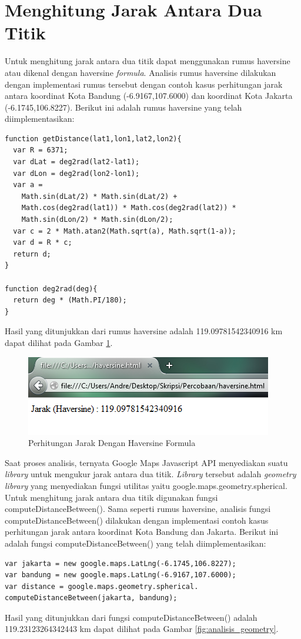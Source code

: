 \section{Menghitung Jarak Antara Dua Titik}
Untuk menghitung jarak antara dua titik dapat menggunakan rumus haversine atau
dikenal dengan haversine \textit{formula}. Analisis rumus haversine dilakukan
dengan implementasi rumus tersebut dengan contoh kasus perhitungan
jarak antara koordinat Kota Bandung (-6.9167,107.6000) dan koordinat Kota
Jakarta (-6.1745,106.8227). Berikut ini adalah rumus haversine yang telah
diimplementasikan:
\begin{verbatim}
function getDistance(lat1,lon1,lat2,lon2){
  var R = 6371; 
  var dLat = deg2rad(lat2-lat1); 
  var dLon = deg2rad(lon2-lon1); 
  var a = 
    Math.sin(dLat/2) * Math.sin(dLat/2) +
    Math.cos(deg2rad(lat1)) * Math.cos(deg2rad(lat2)) * 
    Math.sin(dLon/2) * Math.sin(dLon/2); 
  var c = 2 * Math.atan2(Math.sqrt(a), Math.sqrt(1-a)); 
  var d = R * c; 
  return d;
}

function deg2rad(deg){
  return deg * (Math.PI/180);
}
\end{verbatim}
Hasil yang ditunjukkan dari rumus haversine adalah 119.09781542340916 km dapat
dilihat pada Gambar \ref{fig:analisis_haver}.

\begin{figure}[h]
\centering
\includegraphics[scale=1]{Gambar/analisis_haver}
\caption[Perhitungan Jarak Dengan Haversine Formula]{Perhitungan Jarak Dengan Haversine Formula}
\label{fig:analisis_haver}
\end{figure}
Saat proses analisis, ternyata Google Maps Javascript API menyediakan suatu
\textit{library} untuk mengukur jarak antara dua titik. \textit{Library}
tersebut adalah \textit{geometry library} yang menyediakan fungsi utilitas yaitu
google.maps.geometry.spherical. Untuk menghitung jarak antara dua titik
digunakan fungsi computeDistanceBetween(). Sama seperti rumus haversine,
analisis fungsi computeDistanceBetween() dilakukan dengan implementasi contoh
kasus perhitungan jarak antara koordinat Kota Bandung dan Jakarta. Berikut ini
adalah fungsi computeDistanceBetween() yang telah diimplementasikan:
\begin{verbatim}
var jakarta = new google.maps.LatLng(-6.1745,106.8227);
var bandung = new google.maps.LatLng(-6.9167,107.6000);
var distance = google.maps.geometry.spherical.
computeDistanceBetween(jakarta, bandung);
\end{verbatim}
Hasil yang ditunjukkan dari fungsi computeDistanceBetween() adalah
119.23123264342443 km dapat dilihat pada Gambar \ref{fig:analisis_geometry}.

